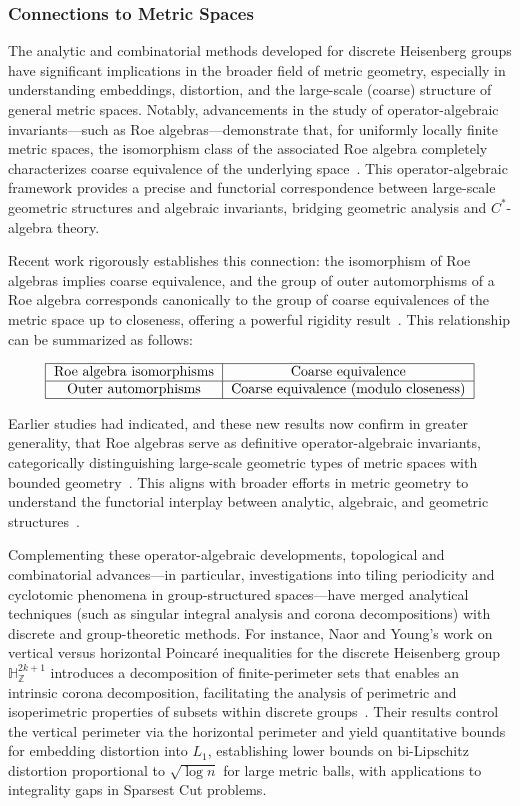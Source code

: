 \documentclass[sigconf]{acmart}
\begin{document}
\subsubsection{Connections to Metric Spaces}

The analytic and combinatorial methods developed for discrete Heisenberg groups have significant implications in the broader field of metric geometry, especially in understanding embeddings, distortion, and the large-scale (coarse) structure of general metric spaces. Notably, advancements in the study of operator-algebraic invariants—such as Roe algebras—demonstrate that, for uniformly locally finite metric spaces, the isomorphism class of the associated Roe algebra completely characterizes coarse equivalence of the underlying space~\cite{ref52}. This operator-algebraic framework provides a precise and functorial correspondence between large-scale geometric structures and algebraic invariants, bridging geometric analysis and $C^*$-algebra theory.

Recent work rigorously establishes this connection: the isomorphism of Roe algebras implies coarse equivalence, and the group of outer automorphisms of a Roe algebra corresponds canonically to the group of coarse equivalences of the metric space up to closeness, offering a powerful rigidity result~\cite{ref52}. This relationship can be summarized as follows:

\[
\begin{tabular}{|c|c|}
\hline
\text{Roe algebra isomorphisms} & \text{Coarse equivalence} \\
\hline
\text{Outer automorphisms} & \text{Coarse equivalence (modulo closeness)} \\
\hline
\end{tabular}
\]

Earlier studies had indicated, and these new results now confirm in greater generality, that Roe algebras serve as definitive operator-algebraic invariants, categorically distinguishing large-scale geometric types of metric spaces with bounded geometry~\cite{ref52}. This aligns with broader efforts in metric geometry to understand the functorial interplay between analytic, algebraic, and geometric structures~\cite{ref51}.

Complementing these operator-algebraic developments, topological and combinatorial advances—in particular, investigations into tiling periodicity and cyclotomic phenomena in group-structured spaces—have merged analytical techniques (such as singular integral analysis and corona decompositions) with discrete and group-theoretic methods. For instance, Naor and Young's work on vertical versus horizontal Poincaré inequalities for the discrete Heisenberg group $\mathbb{H}_{\mathbb{Z}}^{2k+1}$ introduces a decomposition of finite-perimeter sets that enables an intrinsic corona decomposition, facilitating the analysis of perimetric and isoperimetric properties of subsets within discrete groups~\cite{ref108}. Their results control the vertical perimeter via the horizontal perimeter and yield quantitative bounds for embedding distortion into $L_1$, establishing lower bounds on bi-Lipschitz distortion proportional to $\sqrt{\log n}$ for large metric balls, with applications to integrality gaps in Sparsest Cut problems.
\end{document}
